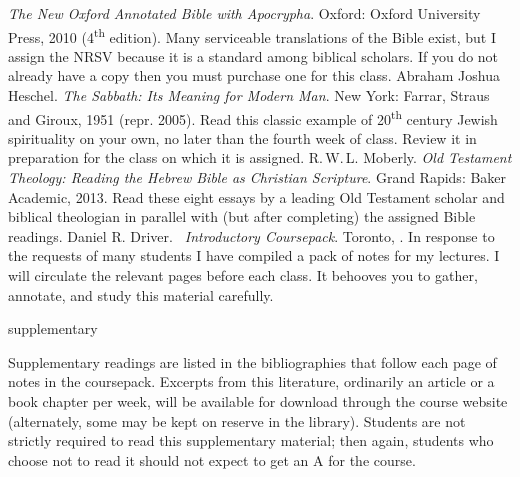 \documentclass[titlepage]{article}
\begin{document}
\begingroup
\renewcommand{\section}[2]{}%
\begin{thebibliography}{Heschel}%
   \emph{The New Oxford Annotated Bible with Apocrypha}.
    Oxford: Oxford University Press, 2010 (4\textsuperscript{th}
    edition). Many serviceable translations of the Bible exist, but I
    assign the NRSV because it is a standard among biblical scholars. If
    you do not already have a copy then you must purchase one for this
    class.
   Abraham Joshua Heschel.
    \emph{The Sabbath: Its Meaning for Modern Man}. New York: Farrar,
    Straus and Giroux, 1951 (repr. 2005). Read this classic example of
    20\textsuperscript{th} century Jewish spirituality on your own, no
    later than the fourth week of class. Review it in preparation for the
    class on which it is assigned.
   R.\,W.\,L. Moberly.
    \emph{Old Testament Theology: Reading the Hebrew Bible as Christian
    Scripture}. Grand Rapids: Baker Academic, 2013. Read these eight
    essays by a leading Old Testament scholar and biblical theologian in
    parallel with (but after completing) the assigned Bible readings.
   Daniel R. Driver.
    \emph{\ctitle\ Introductory Coursepack}. Toronto, \csemester.
    In response to the requests of many students I have compiled a pack
    of notes for my lectures. I will circulate the relevant pages before
    each class. It behooves you to gather, annotate, and study this
    material carefully.
\end{thebibliography}
\endgroup

\section{Supplementary Texts}
\label{supplementary}

Supplementary readings are listed in the bibliographies that follow each
page of notes in the coursepack. Excerpts from this literature,
ordinarily an article or a book chapter per week, will be available for
download through the course website (alternately, some may be kept on
reserve in the library). Students are not strictly required to read this
supplementary material; then again, students who choose not to read it
should not expect to get an A for the course.
\end{document}
